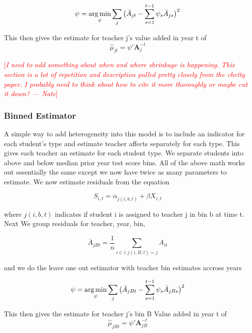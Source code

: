 \documentclass[12pt]{article}
\theoremstyle{definition}
\theoremstyle{definition}
\theoremstyle{definition}
\theoremstyle{definition}
\newcommand\cmnt[2]{\;
{\textcolor{red}{[{\em #1 --- #2}] \;}
}}
\newcommand\nate[1]{\cmnt{#1}{Nate}}
\begin{document}
    \begin{equation}
        \psi = \operatorname*{arg\,min}_{\psi} \sum_j \big(  \bar{A}_{jt} - \sum_{s = 1}^{t-1} \psi_s \bar{A}_{js} \big)^2
    \end{equation}

    This then gives the estimate for teacher j's value added in year t of 
    \begin{equation}
        \hat{\mu}_{jt} = \psi'\mathbf{A}_j^{-t}
    \end{equation}

    \nate{I need to add something about when and where shrinkage is happening. This section is a lot of repetition and description pulled pretty closely from the chetty paper. I probably need to think about how to cite it more thoroughly or maybe cut it down? }

    \subsubsection{Binned Estimator}
    A simple way to add heterogeneity into this model is to include an indicator for each student's type and estimate teacher affects separately for each type. This gives each teacher an estimate for each student type. We separate students into above and below median prior year test score bins. All of the above math works out essentially the same except we now have twice as many parameters to estimate. We now estimate residuals from the equation

     \begin{equation}
        S_{i,t} = \alpha_{j(i,b, t)} + \beta X_{i, t}
    \end{equation}

    where $j(i,b, t)$ indicates if student i is assigned to teacher j in bin b at time t. Next We group residuals for teacher, year, bin, 

    \begin{equation}
        \bar{A}_{jBt} = \frac{1}{n} \sum_{i \in {i: j(i, B, t) = j}} A_{it}
    \end{equation}

    and we do the leave one out estimator with teacher bin estimates accross years 

    \begin{equation}
        \psi = \operatorname*{arg\,min}_{\psi} \sum_j \big(  \bar{A}_{jBt} - \sum_{s = 1}^{t-1} \psi_s \bar{A}_{jBs} \big)^2
    \end{equation}

    This then gives the estimate for teacher j's  bin B Value added in year t of 
    \begin{equation}
        \hat{\mu}_{jBt} = \psi'\mathbf{A}_{jB}^{-t}
    \end{equation}
\end{document}
